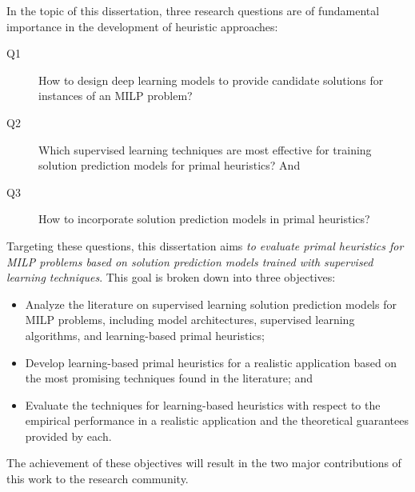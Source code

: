 In the topic of this dissertation, three research questions are of fundamental importance in the development of heuristic approaches:
\begin{description}
    \item[Q1] How to design deep learning models to provide candidate solutions for instances of an MILP problem?
    \item[Q2] Which supervised learning techniques are most effective for training solution prediction models for primal heuristics? And
    \item[Q3] How to incorporate solution prediction models in primal heuristics?
\end{description}
Targeting these questions, this dissertation aims \emph{to evaluate primal heuristics for MILP problems based on solution prediction models trained with supervised learning techniques}.
This goal is broken down into three objectives:
\begin{itemize}
    \item Analyze the literature on supervised learning solution prediction models for MILP problems, including model architectures, supervised learning algorithms, and learning-based primal heuristics;
    \item Develop learning-based primal heuristics for a realistic application based on the most promising techniques found in the literature; and
    \item Evaluate the techniques for learning-based heuristics with respect to the empirical performance in a realistic application and the theoretical guarantees provided by each.
\end{itemize}
The achievement of these objectives will result in the two major contributions of this work to the research community.

